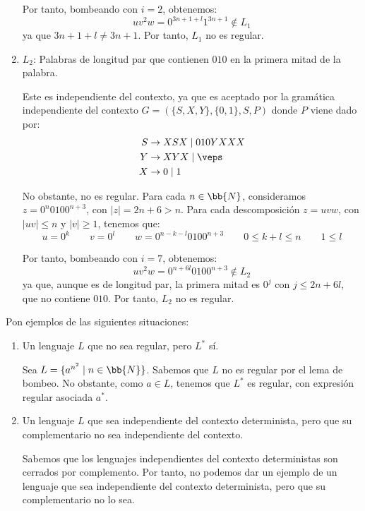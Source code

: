 \documentclass[12pt]{article}
\begin{document}
\begin{ejercicio}[1.25 puntos]
\begin{enumerate}
        Por tanto, bombeando con $i=2$, obtenemos:
        \begin{equation*}
            uv^2w=0^{3n+1+l}1^{3n+1}\notin L_1
        \end{equation*}
        ya que $3n+1+l\neq 3n+1$. Por tanto, $L_1$ no es regular.
        \item $L_2$: Palabras de longitud par que contienen $010$ en la primera mitad de la palabra.
        
        Este es independiente del contexto, ya que es aceptado por la gramática independiente del contexto $G=(\{S,X,Y\}, \{0,1\}, S, P)$ donde $P$ viene dado por:
        \begin{align*}
            S &\rightarrow XSX\mid 010YXXX\\
            Y &\rightarrow XYX \mid \veps\\
            X & \rightarrow 0\mid 1
        \end{align*}

        No obstante, no es regular. Para cada $n\in \bb{N}$, consideramos $z=0^{n}0100^{n+3}$, con $|z|=2n+6>n$. Para cada descomposición $z=uvw$, con $|uv|\leq n$ y $|v|\geq 1$, tenemos que:
        \begin{equation*}
            u=0^k \qquad v=0^l\qquad w=0^{n-k-l}0100^{n+3}
            \qquad 0\leq k+l\leq n \qquad 1\leq l
        \end{equation*}

        Por tanto, bombeando con $i=7$, obtenemos:
        \begin{equation*}
            uv^2w=0^{n+6l}0100^{n+3}\notin L_2
        \end{equation*}
        ya que, aunque es de longitud par, la primera mitad es $0^j$ con $j\leq 2n+6l$, que no contiene $010$. Por tanto, $L_2$ no es regular.
    \end{enumerate}
\end{ejercicio}

\begin{ejercicio}[1.25 puntos]
    Pon ejemplos de las siguientes situaciones:
    \begin{enumerate}
        \item Un lenguaje $L$ que no sea regular, pero $L^*$ sí.
        
        Sea $L=\{a^{n^2}\mid n\in \bb{N}\}$. Sabemos que $L$ no es regular por el lema de bombeo.
        No obstante, como $a\in L$, tenemos que $L^*$ es regular, con expresión regular asociada $a^*$.
        \item Un lenguaje $L$ que sea independiente del contexto determinista, pero que su complementario no sea independiente del contexto.
        
        Sabemos que los lenguajes independientes del contexto deterministas son cerrados por complemento. Por tanto, no podemos dar un ejemplo de un lenguaje que sea independiente del contexto determinista, pero que su complementario no lo sea.
    \end{enumerate}
\end{ejercicio}
\end{document}
